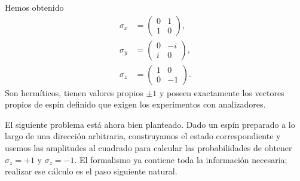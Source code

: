 \begin{classroomqa}\end{classroomqa}

Hemos obtenido
\begin{equation}
\begin{aligned}
\sigma_x&=\begin{pmatrix}0&1\\1&0\end{pmatrix},\\[0.4em]
\sigma_y&=\begin{pmatrix}0&-i\\i&0\end{pmatrix},\\[0.4em]
\sigma_z&=\begin{pmatrix}1&0\\0&-1\end{pmatrix}.
\end{aligned}
\label{eq:pauli-triple}
\end{equation}
Son hermíticos, tienen valores propios \(\pm1\) y poseen exactamente los vectores propios de espín definido que exigen los experimentos con analizadores.

El siguiente problema está ahora bien planteado. Dado un espín preparado a lo largo de una dirección arbitraria, construyamos el estado correspondiente y usemos las amplitudes al cuadrado para calcular las probabilidades de obtener \(\sigma_z=+1\) y \(\sigma_z=-1\). El formalismo ya contiene toda la información necesaria; realizar ese cálculo es el paso siguiente natural.
